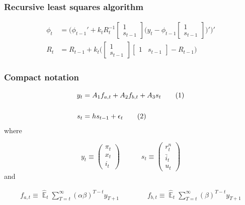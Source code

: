 \documentclass[11pt]{beamer}
\DeclareMathOperator{\E}{\mathbb{E}}
\newcommand\numberthis{\addtocounter{equation}{1}\tag{\theequation}} %
\begin{document}
\begin{frame}
	\frametitle{Recursive least squares algorithm}
	\label{RLS}


\begin{align}
\phi_t  & = \bigg( \phi_{t-1}' + k_t R_t^{-1}\begin{bmatrix} 1 \\ s_{t-1} \end{bmatrix}\bigg(y_{t} - \phi_{t-1} \begin{bmatrix} 1 \\ s_{t-1} \end{bmatrix} \bigg)' \bigg)' \\
R_t &= R_{t-1} +  k_t \bigg( \begin{bmatrix} 1 \\ s_{t-1} \end{bmatrix} \begin{bmatrix} 1 & s_{t-1} \end{bmatrix}  - R_{t-1} \bigg)
\end{align}


\vfill

\hyperlink{anchoring1}{}	


\end{frame}


\begin{frame}
	\frametitle{Compact notation}
	\label{compact}

 \begin{align*}
y_t & = A_1 f_{a,t} + A_2 f_{b,t} + A_3 s_t \label{LOM_LR} \numberthis \\
\\
s_t & = h s_{t-1} + \epsilon_t \label{exog} \numberthis
\end{align*}
where

\begin{equation}
 y_t \equiv \begin{pmatrix} \pi_t \\ x_t \\ i_t
 \end{pmatrix} 
 \quad \quad \quad 
  s_t  \equiv \begin{pmatrix} r_t^n \\ \bar{i}_t \\ u_t 
 \end{pmatrix} 
\end{equation}
and

  \begin{align}
f_{a,t}  \equiv  \hat{\E}_t\sum_{T=t}^{\infty} (\alpha\beta)^{T-t } y_{T+1} \quad \quad \quad \quad 
f_{b,t}  \equiv \hat{\E}_t\sum_{T=t}^{\infty} (\beta)^{T-t } y_{T+1} \label{fafb}
\end{align}

\hyperlink{aggregate_LOMS}{}	


\end{frame}
\end{document}
